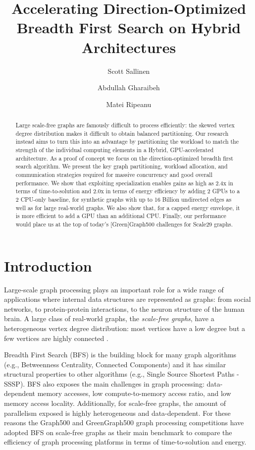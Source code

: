 \documentclass{llncs}
\begin{document}
\title{Accelerating Direction-Optimized Breadth First Search on Hybrid Architectures}\author{Scott Sallinen \and Abdullah Gharaibeh \and Matei Ripeanu}\maketitle \begin{abstract}Large scale-free graphs are famously difficult to process efficiently: the skewed vertex degree distribution makes it difficult to obtain balanced partitioning. Our research instead aims to turn this into an advantage by partitioning the workload to match the strength of the individual computing elements in a Hybrid, GPU-accelerated architecture. As a proof of concept we focus on the direction-optimized breadth first search algorithm. We present the key graph partitioning, workload allocation, and communication strategies required for massive concurrency and good overall performance. We show that exploiting specialization enables gains as high as 2.4x in terms of time-to-solution and 2.0x in terms of energy efficiency by adding 2 GPUs to a 2 CPU-only baseline, for synthetic graphs with up to 16 Billion undirected edges as well as for large real-world graphs. We also show that, for a capped energy envelope, it is more efficient to add a GPU than an additional CPU.  Finally, our performance would place us at the top of today's [Green]Graph500 challenges for Scale29 graphs.  
\end{abstract}\section{Introduction}\label{sec:intro}Large-scale graph processing plays an important role for a wide range of applications where internal data structures are represented as graphs: from social networks, to protein-protein interactions, to the neuron structure of the human brain. A large class of real-world graphs, the \textit{scale-free graphs}, have a heterogeneous vertex degree distribution: most vertices have a low degree but a few vertices are highly connected \cite{wang2003complex} \cite{jeong2001lethality} \cite{bullmore2009complex}.

Breadth First Search (BFS) is the building block for many graph algorithms (e.g., Betweenness Centrality,  Connected Components) and it has similar structural properties to other algorithms (e.g., Single Source Shortest Paths - SSSP). BFS also exposes the main challenges in graph processing: data-dependent memory accesses, low compute-to-memory access ratio, and low memory access locality. Additionally, for scale-free graphs, the amount of parallelism exposed is highly heterogeneous and data-dependent. For these reasons the Graph500 \cite{Graph500} and GreenGraph500 \cite{GreenGraph500} graph processing competitions have adopted BFS on scale-free graphs as their main benchmark to compare the efficiency of graph processing platforms in terms of time-to-solution and energy.
\end{document}
